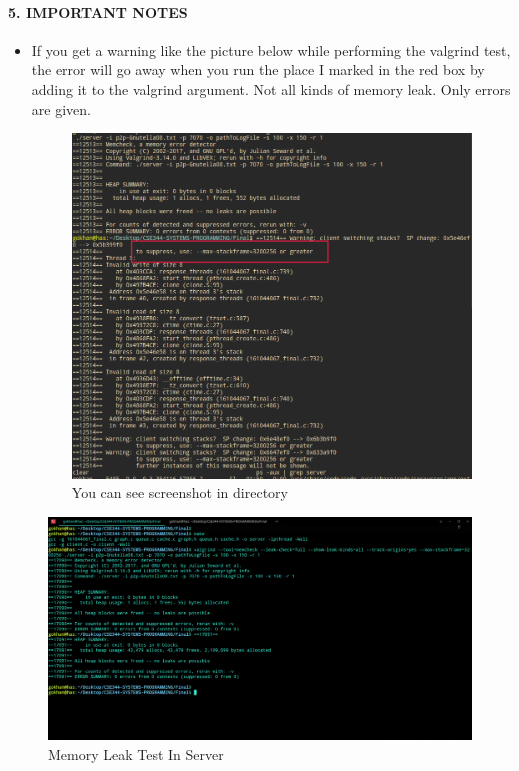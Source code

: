 \documentclass[a4paper,12pt]{report}
\begin{document}
\paragraph{5. IMPORTANT NOTES\newline}
\begin{itemize}
    \item If you get a warning like the picture below while performing the valgrind test, the error will go away when you run the place I marked in the red box by adding it to the valgrind argument. Not all kinds of memory leak. Only errors are given.
    \begin{figure}[h!]
    \centering
    \includegraphics[scale=0.3]{6_walgrind_warnings.png}
    \caption{You can see screenshot in directory}
    \label{fig:compile}
    \end{figure}
\end{itemize}

\begin{figure}[h!]
\centering
\includegraphics[scale=0.3]{7_memoryleak.png}
\caption{Memory Leak Test In Server}
\label{fig:compile}
\end{figure}
\end{document}
